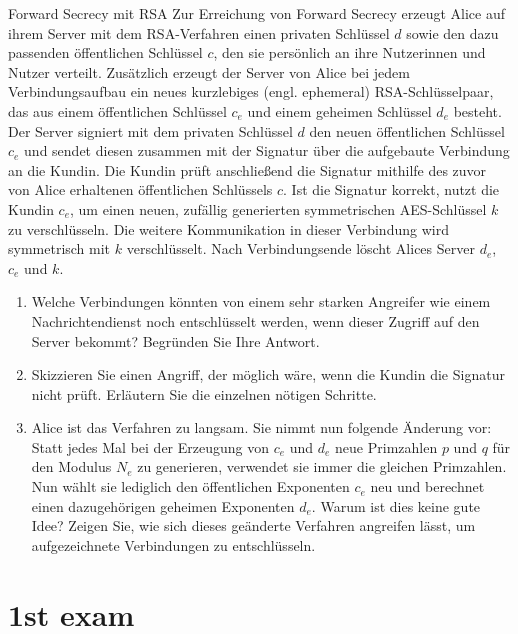 \documentclass{article}
\begin{document}
\begin{exercise}{Forward Secrecy mit RSA}
  Zur Erreichung von Forward Secrecy erzeugt Alice auf ihrem Server mit dem RSA-Verfahren einen privaten Schlüssel $d$ sowie den dazu passenden öffentlichen Schlüssel $c$, den sie persönlich an ihre Nutzerinnen und Nutzer verteilt. Zusätzlich erzeugt der Server von Alice bei jedem Verbindungsaufbau ein neues kurzlebiges (engl. ephemeral) RSA-Schlüsselpaar, das aus einem öffentlichen Schlüssel $c_e$ und einem geheimen Schlüssel $d_e$ besteht. Der Server signiert mit dem privaten Schlüssel $d$ den neuen öffentlichen Schlüssel $c_e$ und sendet diesen zusammen mit der Signatur über die aufgebaute Verbindung an die Kundin. Die Kundin prüft anschließend die Signatur mithilfe des zuvor von Alice erhaltenen öffentlichen Schlüssels $c$. Ist die Signatur korrekt, nutzt die Kundin $c_e$, um einen neuen, zufällig generierten symmetrischen AES-Schlüssel $k$ zu verschlüsseln. Die weitere Kommunikation in dieser Verbindung wird symmetrisch mit $k$ verschlüsselt. Nach Verbindungsende löscht Alices Server $d_e$, $c_e$ und $k$.

  \begin{enumerate}
    \item Welche Verbindungen könnten von einem sehr starken Angreifer wie einem Nachrichtendienst noch entschlüsselt werden, wenn dieser Zugriff auf den Server bekommt? Begründen Sie Ihre Antwort.
    \item Skizzieren Sie einen Angriff, der möglich wäre, wenn die Kundin die Signatur nicht prüft. Erläutern Sie die einzelnen nötigen Schritte.
    \item Alice ist das Verfahren zu langsam. Sie nimmt nun folgende Änderung vor: Statt jedes Mal bei der Erzeugung von $c_e$ und $d_e$ neue Primzahlen $p$ und $q$ für den Modulus $N_e$ zu generieren, verwendet sie immer die gleichen Primzahlen. Nun wählt sie lediglich den öffentlichen Exponenten $c_e$ neu und berechnet einen dazugehörigen geheimen Exponenten $d_e$. Warum ist dies keine gute Idee? Zeigen Sie, wie sich dieses geänderte Verfahren angreifen lässt, um aufgezeichnete Verbindungen zu entschlüsseln.
  \end{enumerate}

  \begin{solution}
  \end{solution}
\end{exercise}



\setcounter{section}{2021}
\section{1st exam}
\end{document}
